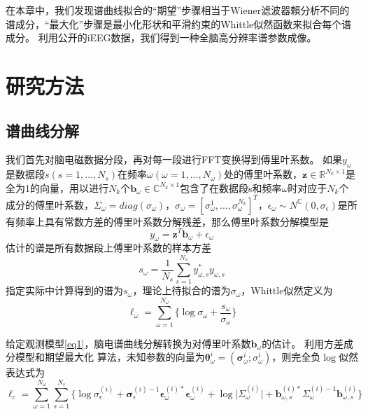 在本章中，我们发现谱曲线拟合的“期望”步骤相当于Wiener滤波器賴分析不同的谱成分，“最大化”步骤是最小化形状和平滑约束的Whittle似然函数来拟合每个谱成分。  利用公开的iEEG数据，我们得到一种全脑高分辨率谱参数成像。

\section{研究方法}
\subsection{谱曲线分解}
我们首先对脑电磁数据分段，再对每一段进行FFT变换得到傅里叶系数。 如果$y_\omega$是数据段$s(s=1,...,N_s)$在频率$\omega(\omega=1,...,N_\omega)$处的傅里叶系数，$\mathbf{z}\in{\mathbb{R}^{N_k\times{1}}}$是全为1的向量，用以进行$N_k$个$\mathbf{b}_\omega\in{\mathbb{C}^{N_k\times{1}}}$包含了在数据段s和频率$\omega$时对应于$N_k$个成分的傅里叶系数，$\Sigma_\omega=diag(\sigma_\omega)$，$\sigma_\omega=[\sigma_\omega^1,...,\sigma_\omega^{N_k}]^T$，$\epsilon_\omega\sim{N^\mathbb{C}(0,\sigma_\epsilon)}$是所有频率上具有常数方差的傅里叶系数分解残差，那么傅里叶系数分解模型是
\begin{equation}\label{eq1}
y_\omega=\mathbf{z}^T\mathbf{b}_\omega+\epsilon_\omega
\end{equation}
估计的谱是所有数据段上傅里叶系数的样本方差
\begin{equation}\label{eq2}
s_\omega=\frac{1}{N_s}\sum_{s=1}^{N_s}y_{\omega,s}^*y_{\omega,s}
\end{equation}
指定实际中计算得到的谱为$s_\omega$，理论上待拟合的谱为$\sigma_\omega$，Whittle似然定义为
\begin{equation}\label{eq3}
\ell_\omega=\sum_{\omega=1}^{N_\omega}\lbrace\log{\sigma_\omega}+\frac{s_\omega}{\sigma_\omega}\rbrace
\end{equation}

给定观测模型\eqref{eq1}，脑电谱曲线分解转换为对傅里叶系数$\mathbf{b}_\omega$的估计。 利用方差成分模型和期望最大化
算法，未知参数的向量为$\mathbf{\theta}_\omega^{i}=(\mathbf{\sigma}_\omega^{i};\sigma_\omega^{i})$，则完全负$\log$似然表达式为
\begin{equation}\label{eq4}
\ell_c=\sum_{\omega=1}^{N_\omega}\sum_{s=1}^{N_s}\lbrace\log{\sigma}_\epsilon^{(i)}+\mathbf{\sigma}_\epsilon^{(i)-1}\mathbf{\epsilon}_\omega^{(i)*}\mathbf{\epsilon}_\omega^{(i)}+\log\lvert\Sigma_\omega^{(i)}\rvert+\mathbf{b}_{\omega,s}^{(i)*}\Sigma_\omega^{(i)-1}\mathbf{b}_{\omega,s}^{(i)}\rbrace
\end{equation}

